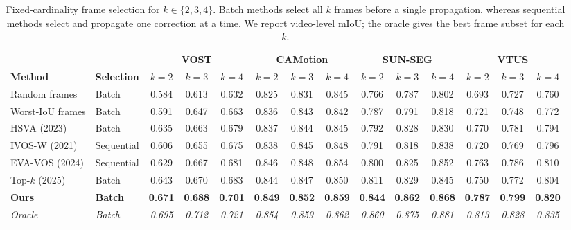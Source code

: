 \begin{table}[t]
\caption{Fixed-cardinality frame selection for \(k\in\{2,3,4\}\). Batch methods select all \(k\) frames before a single propagation, whereas sequential methods select and propagate one correction at a time. We report video-level mIoU; the oracle gives the best frame subset for each \(k\).}
\label{tab:fixed_cardinality_appendix}

\centering
\small
\setlength{\tabcolsep}{3.2pt}
\begin{tabular}{@{}llcccccccccccc@{}}
\toprule
& & \multicolumn{3}{c}{\textbf{VOST}} & \multicolumn{3}{c}{\textbf{CAMotion}} & \multicolumn{3}{c}{\textbf{SUN-SEG}} & \multicolumn{3}{c}{\textbf{VTUS}} \\
\cmidrule(lr){3-5} \cmidrule(lr){6-8} \cmidrule(lr){9-11} \cmidrule(l){12-14}
\textbf{Method} & \textbf{Selection} & \(k{=}2\) & \(k{=}3\) & \(k{=}4\) & \(k{=}2\) & \(k{=}3\) & \(k{=}4\) & \(k{=}2\) & \(k{=}3\) & \(k{=}4\) & \(k{=}2\) & \(k{=}3\) & \(k{=}4\) \\
\midrule
Random frames & Batch & 0.584 & 0.613 & 0.632 & 0.825 & 0.831 & 0.845 & 0.766 & 0.787 & 0.802 & 0.693 & 0.727 & 0.760 \\
Worst-IoU frames & Batch & 0.591 & 0.647 & 0.663 & 0.836 & 0.843 & 0.842 & 0.787 & 0.791 & 0.818 & 0.721 & 0.748 & 0.772 \\
HSVA (2023) & Batch & 0.635 & 0.663 & 0.679 & 0.837 & 0.844 & 0.845 & 0.792 & 0.828 & 0.830 & 0.770 & 0.781 & 0.794 \\
IVOS-W (2021) & Sequential & 0.606 & 0.655 & 0.675 & 0.838 & 0.845 & 0.848 & 0.791 & 0.818 & 0.838 & 0.720 & 0.769 & 0.796 \\
EVA-VOS (2024) & Sequential & 0.629 & 0.667 & 0.681 & 0.846 & 0.848 & 0.854 & 0.800 & 0.825 & 0.852 & 0.763 & 0.786 & 0.810 \\
Top-\(k\) (2025) & Batch & 0.643 & 0.670 & 0.683 & 0.844 & 0.847 & 0.850 & 0.811 & 0.829 & 0.845 & 0.750 & 0.772 & 0.804 \\
\textbf{Ours} & \textbf{Batch} & \textbf{0.671} & \textbf{0.688} & \textbf{0.701} & \textbf{0.849} & \textbf{0.852} & \textbf{0.859} & \textbf{0.844} & \textbf{0.862} & \textbf{0.868} & \textbf{0.787} & \textbf{0.799} & \textbf{0.820} \\
\midrule
\emph{Oracle} & \emph{Batch} & \emph{0.695} & \emph{0.712} & \emph{0.721} & \emph{0.854} & \emph{0.859} & \emph{0.862} & \emph{0.860} & \emph{0.875} & \emph{0.881} & \emph{0.813} & \emph{0.828} & \emph{0.835} \\
\bottomrule
\end{tabular}

\end{table}
